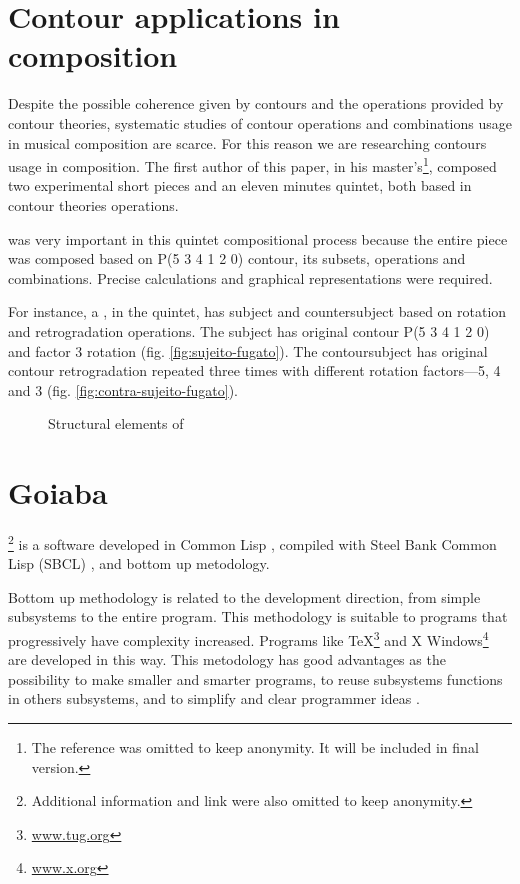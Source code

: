 \section{Contour applications in composition}
\label{sec:cont-appl-comp}

Despite the possible coherence given by contours and the operations
provided by contour theories, systematic studies of contour operations
and combinations usage in musical composition are scarce. For this
reason we are researching contours usage in composition. The first
author of this paper, in his master's\footnote{The reference was
  omitted to keep anonymity. It will be included in final version.},
composed two experimental short pieces and an eleven minutes quintet,
both based in contour theories operations.

\goiaba{} was very important in this quintet compositional process
because the entire piece was composed based on P(5 3 4 1 2 0) contour,
its subsets, operations and combinations. Precise calculations and
graphical representations were required.

For instance, a , in the quintet, has subject and
countersubject based on rotation and retrogradation operations. The
subject has original contour P(5 3 4 1 2 0) and factor 3 rotation
(fig. \ref{fig:sujeito-fugato}). The contoursubject has original
contour retrogradation repeated three times with different rotation
factors---5, 4 and 3 (fig. \ref{fig:contra-sujeito-fugato}).

\begin{figure*}
  \centering

  \caption{Structural elements of }
  \label{fig:elementos-fugato}
\end{figure*}

\section{Goiaba}
\label{sec:goiaba}

\goiaba{}\footnote{Additional information and link were also omitted
  to keep anonymity.} is a software developed in Common Lisp
\cite{graham94:lisp}, compiled with Steel Bank Common Lisp (SBCL)
\cite{team07:sbcl}, and bottom up metodology.

Bottom up methodology is related to the development direction, from
simple subsystems to the entire program. This methodology is suitable
to programs that progressively have complexity increased. Programs
like \TeX{}\footnote{\url{www.tug.org}} and X
Windows\footnote{\url{www.x.org}} are developed in this way. This
metodology has good advantages as the possibility to make smaller and
smarter programs, to reuse subsystems functions in others subsystems,
and to simplify and clear programmer ideas \cite{graham94:lisp}.

